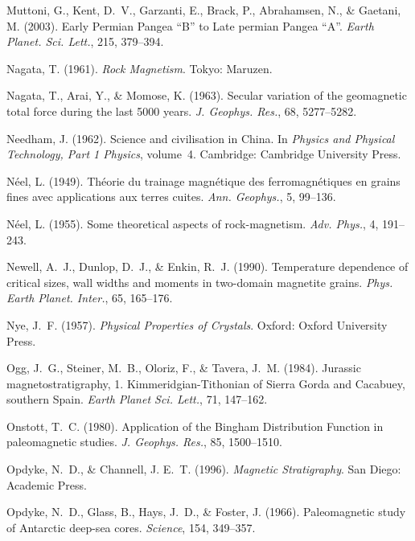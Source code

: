 \documentclass[,plain]{tauxe}
\begin{document}
\begin{thebibliography}{}
\bibitem{}%
Muttoni, G., Kent, D.~V., Garzanti, E., Brack, P., Abrahamsen, N., \& Gaetani, M. (2003).
Early Permian Pangea ``B'' to Late permian Pangea ``A''.
{\it Earth Planet. Sci. Lett.}, 215, 379--394.

\bibitem{}%
Nagata, T. (1961).
{\it Rock Magnetism}.
Tokyo: Maruzen.

\bibitem{}%
Nagata, T., Arai, Y., \& Momose, K. (1963).
Secular variation of the geomagnetic total force during the last 5000 years.
{\it J. Geophys. Res.}, 68, 5277--5282.

\bibitem{}%
Needham, J. (1962).
Science and civilisation in China.
In {\it Physics and Physical Technology, Part 1 Physics}, volume~4. Cambridge: Cambridge University Press.

\bibitem{}%
N\'eel, L. (1949).
Th\' eorie du trainage magn\' etique des ferromagn\' etiques en grains fines avec applications aux terres cuites.
{\it Ann. Geophys.}, 5, 99--136.

\bibitem{}%
N\'eel, L. (1955).
Some theoretical aspects of rock-magnetism.
{\it Adv. Phys.}, 4, 191--243.

\bibitem{}%
Newell, A.~J., Dunlop, D.~J., \& Enkin, R.~J. (1990).
Temperature dependence of critical sizes, wall widths and moments in two-domain magnetite grains.
{\it Phys. Earth Planet. Inter.}, 65, 165--176.

\bibitem{}%
Nye, J.~F. (1957).
{\it Physical Properties of Crystals}.
Oxford: Oxford University Press.

\bibitem{}%
Ogg, J.~G., Steiner, M.~B., Oloriz, F., \& Tavera, J.~M. (1984).
Jurassic magnetostratigraphy, 1. Kimmeridgian-Tithonian of Sierra Gorda and Cacabuey, southern Spain.
{\it Earth Planet Sci. Lett.}, 71, 147--162.

\bibitem{}%
Onstott, T.~C. (1980).
Application of the Bingham Distribution Function in paleomagnetic studies.
{\it J. Geophys. Res.}, 85, 1500--1510.

\bibitem{}%
Opdyke, N.~D., \& Channell, J. E.~T. (1996).
{\it Magnetic Stratigraphy}. San Diego:
Academic Press.

\bibitem{}%
Opdyke, N.~D., Glass, B., Hays, J.~D., \& Foster, J. (1966).
Paleomagnetic study of Antarctic deep-sea cores.
{\it Science}, 154, 349--357.


\end{thebibliography}
\end{document}
